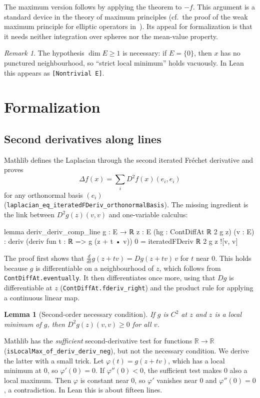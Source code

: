 \documentclass[11pt]{article}
\newtheorem{lemma}[theorem]{Lemma}
\theoremstyle{remark}
\newtheorem{remark}[theorem]{Remark}
\begin{document}
The maximum version follows by applying the theorem to $-f$. This argument is a standard device in
the theory of maximum principles (cf.\ the proof of the weak maximum principle for elliptic operators in~\cite{evans}). Its appeal for formalization
is that it needs neither integration over spheres nor the mean-value property.

\begin{remark}
The hypothesis $\dim E\ge1$ is necessary: if $E=\{0\}$, then $x$ has no punctured neighbourhood,
so ``strict local minimum'' holds vacuously. In Lean this appears as \texttt{[Nontrivial E]}.
\end{remark}

\section{Formalization}

\subsection{Second derivatives along lines}\label{sec:second}

Mathlib defines the Laplacian through the second iterated Fréchet derivative and proves
\[
  \Delta f(x)=\sum_i D^2f(x)(e_i,e_i)
\]
for any orthonormal basis $(e_i)$ (\texttt{laplacian\_eq\_iteratedFDeriv\_orthonormalBasis}). The
missing ingredient is the link between $D^2g(z)(v,v)$ and one-variable calculus:

\begin{lean}
lemma deriv_deriv_comp_line {g : E → ℝ} {z : E} (hg : ContDiffAt ℝ 2 g z) (v : E) :
    deriv (deriv fun t : ℝ => g (z + t • v)) 0 = iteratedFDeriv ℝ 2 g z ![v, v]
\end{lean}

The proof first shows that $\frac{d}{dt}g(z+tv)=Dg(z+tv)\,v$ for $t$ near $0$. This holds because
$g$ is differentiable on a neighbourhood of $z$, which follows from \texttt{ContDiffAt.eventually}.
It then differentiates once more, using that $Dg$ is differentiable at $z$
(\texttt{ContDiffAt.fderiv\_right}) and the product rule for applying a continuous linear map.

\begin{lemma}[Second-order necessary condition]\label{lem:soc}
If $g$ is $C^2$ at $z$ and $z$ is a local minimum of $g$, then $D^2g(z)(v,v)\ge0$ for all $v$.
\end{lemma}

Mathlib has the \emph{sufficient} second-derivative test for functions $\mathbb{R}\to\mathbb{R}$
(\texttt{isLocalMax\_of\_deriv\_deriv\_neg}), but not the necessary condition. We derive the latter
with a small trick. Let $\varphi(t)=g(z+tv)$, which has a local minimum at $0$, so $\varphi'(0)=0$.
If $\varphi''(0)<0$, the sufficient test makes $0$ also a local maximum. Then $\varphi$ is
constant near $0$, so $\varphi'$ vanishes near $0$ and $\varphi''(0)=0$, a contradiction. In Lean
this is about fifteen lines.
\end{document}
